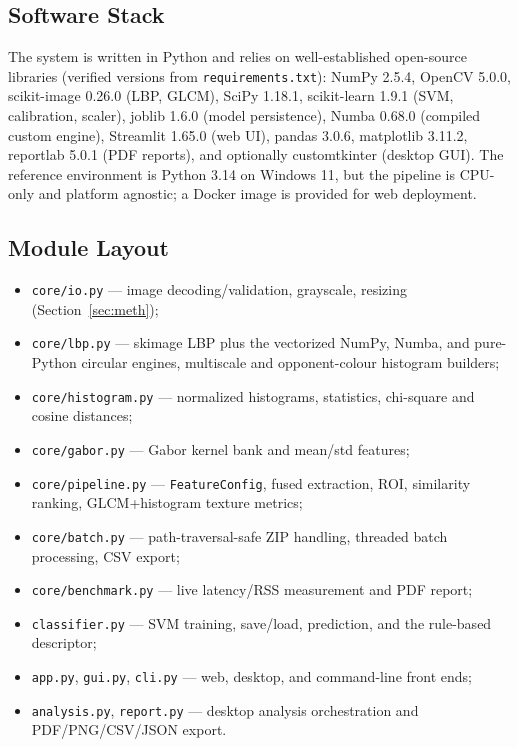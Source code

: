 \documentclass[conference]{IEEEtran}
\begin{document}
\subsection{Software Stack}
The system is written in Python and relies on well-established open-source
libraries (verified versions from \texttt{requirements.txt}): NumPy 2.5.4,
OpenCV 5.0.0, scikit-image 0.26.0 (LBP, GLCM), SciPy 1.18.1,
scikit-learn 1.9.1 (SVM, calibration, scaler), joblib 1.6.0 (model
persistence), Numba 0.68.0 (compiled custom engine), Streamlit 1.65.0
(web UI), pandas 3.0.6, matplotlib 3.11.2, reportlab 5.0.1 (PDF reports),
and optionally customtkinter (desktop GUI). The reference environment is
Python 3.14 on Windows 11, but the pipeline is CPU-only and platform
agnostic; a Docker image is provided for web deployment.

\subsection{Module Layout}
\begin{itemize}
\item \texttt{core/io.py} --- image decoding/validation, grayscale,
resizing (Section~\ref{sec:meth});
\item \texttt{core/lbp.py} --- skimage LBP plus the vectorized NumPy,
Numba, and pure-Python circular engines, multiscale and opponent-colour
histogram builders;
\item \texttt{core/histogram.py} --- normalized histograms, statistics,
chi-square and cosine distances;
\item \texttt{core/gabor.py} --- Gabor kernel bank and mean/std features;
\item \texttt{core/pipeline.py} --- \texttt{FeatureConfig}, fused
extraction, ROI, similarity ranking, GLCM+histogram texture metrics;
\item \texttt{core/batch.py} --- path-traversal-safe ZIP handling,
threaded batch processing, CSV export;
\item \texttt{core/benchmark.py} --- live latency/RSS measurement and PDF
report;
\item \texttt{classifier.py} --- SVM training, save/load, prediction, and
the rule-based descriptor;
\item \texttt{app.py}, \texttt{gui.py}, \texttt{cli.py} --- web, desktop,
and command-line front ends;
\item \texttt{analysis.py}, \texttt{report.py} --- desktop analysis
orchestration and PDF/PNG/CSV/JSON export.
\end{itemize}
\end{document}
